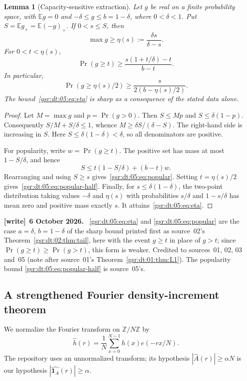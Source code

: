 \documentclass[11pt,letterpaper]{article}
\numberwithin{equation}{section}
\newtheorem{lemma}[theorem]{Lemma}
\theoremstyle{definition}
\theoremstyle{remark}
\newcommand{\E}{\mathbb E}
\newcommand{\Z}{\mathbb Z}
\newcommand{\one}{\mathbf 1}
\newcommand{\1}{\mathbf 1}
\newenvironment{writenote}[1][]{\par\smallskip\begingroup\small
 \noindent\textbf{[write]}\if\relax\detokenize{#1}\relax\else~\textbf{#1.}\fi\ }%
 {\par\endgroup\smallskip}
\begin{document}
\begin{lemma}[Capacity-sensitive extraction]
\label{gsr:dt:05:lem:capacity}
Let $g$ be real on a finite probability space, with $\E g=0$ and
$-\delta\leq g\leq b=1-\delta$, where $0<\delta<1$. Put
$S=\E g_+=\E(-g)_+$. If $0<s\leq S$, then
\begin{equation}
 \max g\geq\eta(s):=\frac{\delta s}{\delta-s}.
 \label{gsr:dt:05:eq:eta}
\end{equation}
For $0<t<\eta(s)$,
\begin{equation}
 \Pr(g\geq t)\geq
 \frac{s(1+t/\delta)-t}{b-t}.
 \label{gsr:dt:05:eq:popular}
\end{equation}
In particular,
\begin{equation}
 \Pr(g\geq\eta(s)/2)\geq\frac{s}{2(b-\eta(s)/2)}.
 \label{gsr:dt:05:eq:popular-half}
\end{equation}
The bound~\eqref{gsr:dt:05:eq:eta} is sharp as a consequence of the stated data alone.
\end{lemma}
\begin{proof}
Let $M=\max g$ and $p=\Pr(g>0)$. Then
$S\leq Mp$ and $S\leq\delta(1-p)$. Consequently
$S/M+S/\delta\leq1$, whence $M\geq\delta S/(\delta-S)$. The right-hand side is increasing in $S$. Here $S\leq\delta(1-\delta)<\delta$, so all denominators are positive.

For popularity, write $w=\Pr(g\geq t)$. The positive set has mass at most $1-S/\delta$, and hence
\[
 S\leq t(1-S/\delta)+(b-t)w.
\]
Rearranging and using $S\geq s$ gives~\eqref{gsr:dt:05:eq:popular}. Setting $t=\eta(s)/2$ gives~\eqref{gsr:dt:05:eq:popular-half}. Finally, for $s\leq\delta(1-\delta)$, the two-point distribution taking values $-\delta$ and $\eta(s)$ with probabilities $s/\delta$ and $1-s/\delta$ has mean zero and positive mass exactly $s$. It attains~\eqref{gsr:dt:05:eq:eta}.
\end{proof}
\begin{writenote}[6 October 2026]
\eqref{gsr:dt:05:eq:eta} and \eqref{gsr:dt:05:eq:popular} are the case $a=\delta$, $b=1-\delta$ of the sharp bound printed first as source~02's Theorem~\ref{gsr:dt:02:thm:tail}, here with the event $g\ge t$ in place of $g>t$; since $\Pr(g\ge t)\ge\Pr(g>t)$, this form is weaker. Credited to sources~01, 02, 03 and~05 (note after source~01's Theorem~\ref{gsr:dt:01:thm:L1}). The popularity bound \eqref{gsr:dt:05:eq:popular-half} is source~05's.
\end{writenote}

\subsection{A strengthened Fourier density-increment theorem}
We normalize the Fourier transform on $\Z/N\Z$ by
\[
 \widehat h(r)=\frac1N\sum_{x=0}^{N-1}h(x)e(-rx/N).
\]
The repository uses an unnormalized transform; its hypothesis $|\widehat A(r)|\geq\alpha N$ is our hypothesis $|\widehat{\one_A}(r)|\geq\alpha$.
\end{document}
